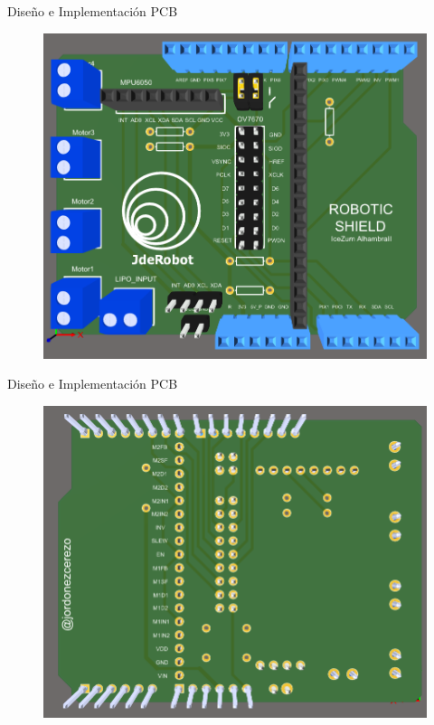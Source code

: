\documentclass{beamer}
\begin{document}
\begin{frame}{Diseño e Implementación PCB}
	\begin{figure}[H]
		\center
		\includegraphics[scale=0.45]{imagenes/Balancing_Robot/top_3D.PNG}
	\end{figure}
\end{frame}

\begin{frame}{Diseño e Implementación PCB}
		\begin{figure}[H]
	\center
	\includegraphics[scale=0.45]{imagenes/Balancing_Robot/bottom_3D.PNG}
\end{figure}
\end{frame}
\end{document}
